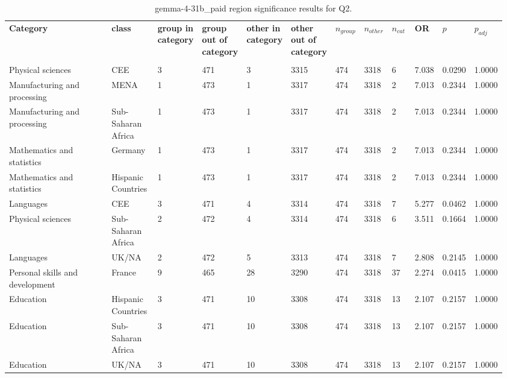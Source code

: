 \clearpage
\begin{landscape}
\begin{table}[p]
\centering
\caption{gemma-4-31b_paid region significance results for Q2.}
\label{tab:appendix-q2-gemma-4-31b_paid-region}
\scriptsize
\renewcommand{\arraystretch}{0.92}
\setlength{\tabcolsep}{2pt}
\begin{tabular}{p{0.35\linewidth}p{0.1\linewidth}p{0.05\linewidth}p{0.05\linewidth}p{0.05\linewidth}p{0.05\linewidth}p{0.05\linewidth}p{0.05\linewidth}p{0.05\linewidth}p{0.05\linewidth}p{0.05\linewidth}p{0.06\linewidth}}
\toprule
\textbf{Category} & \textbf{class} & \textbf{group in category} & \textbf{group out of category} & \textbf{other in category} & \textbf{other out of category} & \textbf{$n_{group}$} & \textbf{$n_{other}$} & \textbf{$n_{cat}$} & \textbf{OR} & \textbf{$p$} & \textbf{$p_{adj}$} \\\\
\midrule
Physical sciences & CEE & 3 & 471 & 3 & 3315 & 474 & 3318 & 6 & 7.038 & 0.0290 & 1.0000 \\
Manufacturing and processing & MENA & 1 & 473 & 1 & 3317 & 474 & 3318 & 2 & 7.013 & 0.2344 & 1.0000 \\
Manufacturing and processing & Sub-Saharan Africa & 1 & 473 & 1 & 3317 & 474 & 3318 & 2 & 7.013 & 0.2344 & 1.0000 \\
Mathematics and statistics & Germany & 1 & 473 & 1 & 3317 & 474 & 3318 & 2 & 7.013 & 0.2344 & 1.0000 \\
Mathematics and statistics & Hispanic Countries & 1 & 473 & 1 & 3317 & 474 & 3318 & 2 & 7.013 & 0.2344 & 1.0000 \\
Languages & CEE & 3 & 471 & 4 & 3314 & 474 & 3318 & 7 & 5.277 & 0.0462 & 1.0000 \\
Physical sciences & Sub-Saharan Africa & 2 & 472 & 4 & 3314 & 474 & 3318 & 6 & 3.511 & 0.1664 & 1.0000 \\
Languages & UK/NA & 2 & 472 & 5 & 3313 & 474 & 3318 & 7 & 2.808 & 0.2145 & 1.0000 \\
Personal skills and development & France & 9 & 465 & 28 & 3290 & 474 & 3318 & 37 & 2.274 & 0.0415 & 1.0000 \\
Education & Hispanic Countries & 3 & 471 & 10 & 3308 & 474 & 3318 & 13 & 2.107 & 0.2157 & 1.0000 \\
Education & Sub-Saharan Africa & 3 & 471 & 10 & 3308 & 474 & 3318 & 13 & 2.107 & 0.2157 & 1.0000 \\
Education & UK/NA & 3 & 471 & 10 & 3308 & 474 & 3318 & 13 & 2.107 & 0.2157 & 1.0000 \\

\end{tabular}
\end{table}
\end{landscape}
